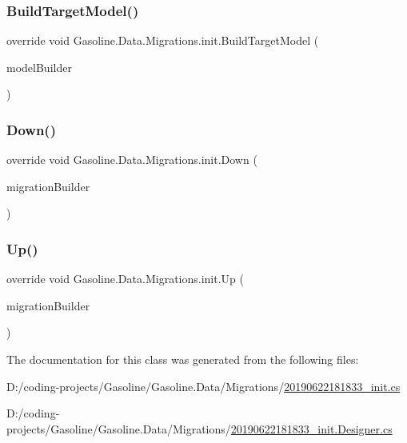 \subsubsection{\texorpdfstring{BuildTargetModel()}{BuildTargetModel()}}
{\footnotesize\ttfamily override void Gasoline.\+Data.\+Migrations.\+init.\+Build\+Target\+Model (\begin{DoxyParamCaption}\item[{Model\+Builder}]{model\+Builder }\end{DoxyParamCaption})\hspace{0.3cm}{\ttfamily [protected]}}

\mbox{\label{class_gasoline_1_1_data_1_1_migrations_1_1init_a7185d1b1b170ff8dd03bf2d531826775}} 
\subsubsection{\texorpdfstring{Down()}{Down()}}
{\footnotesize\ttfamily override void Gasoline.\+Data.\+Migrations.\+init.\+Down (\begin{DoxyParamCaption}\item[{Migration\+Builder}]{migration\+Builder }\end{DoxyParamCaption})\hspace{0.3cm}{\ttfamily [protected]}}

\mbox{\label{class_gasoline_1_1_data_1_1_migrations_1_1init_a0f50c7d07da162147ecb27928c29699a}} 
\subsubsection{\texorpdfstring{Up()}{Up()}}
{\footnotesize\ttfamily override void Gasoline.\+Data.\+Migrations.\+init.\+Up (\begin{DoxyParamCaption}\item[{Migration\+Builder}]{migration\+Builder }\end{DoxyParamCaption})\hspace{0.3cm}{\ttfamily [protected]}}



The documentation for this class was generated from the following files\+:\begin{DoxyCompactItemize}
\item 
D\+:/coding-\/projects/\+Gasoline/\+Gasoline.\+Data/\+Migrations/\mbox{\hyperlink{20190622181833__init_8cs}{20190622181833\+\_\+init.\+cs}}\item 
D\+:/coding-\/projects/\+Gasoline/\+Gasoline.\+Data/\+Migrations/\mbox{\hyperlink{20190622181833__init_8_designer_8cs}{20190622181833\+\_\+init.\+Designer.\+cs}}\end{DoxyCompactItemize}
